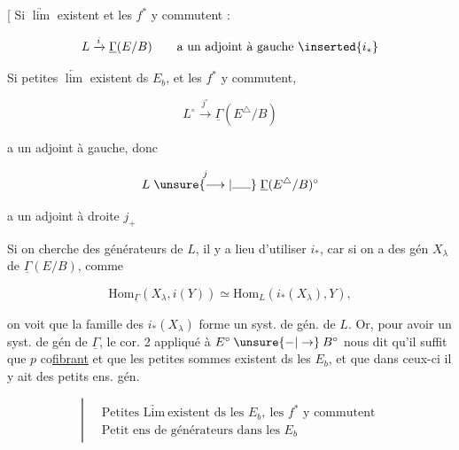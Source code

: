 [ Si  $\underrightarrow{\lim}$ existent  et les $f^*$ y commutent :

\[
L\xrightarrow{i}\underline{\Gamma}(E/B)\qquad\text{a un adjoint à gauche }\inserted{i_*}
\]

Si petites $\underleftarrow{\lim}$ existent ds $E_b$, et les $f^*$ y commutent,

\[
L^\circ\xrightarrow{j^\circ}\underline{\Gamma}(E^{\triangle}/B)
\]

a un adjoint à gauche, donc

\[
L\mathrel{\overset{j}{\unsure{\longrightarrow|\rule{1.5em}{.35pt}}}}\underline{\Gamma}(E^\triangle/B)^\circ
\]

a un adjoint à droite $j_+$

Si on cherche des générateurs de $L$, il y a
lieu d'utiliser $i_*$, car  si on a des
gén $X_\lambda$ de $\underline{\Gamma}(E/B)$, comme

\[
\mathrm{Hom}_{\underline{\Gamma}}(X_\lambda,i(Y))\simeq
\mathrm{Hom}_L(i_*(X_\lambda),Y),
\]

on voit que la famille des $i_*(X_\lambda)$ forme un
syst. de gén. de $L$. Or, pour avoir un 
syst. de gén de $\underline{\Gamma}$, le cor. 2  appliqué
à $E^\circ\mathbin{\unsure{-|\to}}B^\circ$ nous dit qu'il suffit que
$p$ co\uline{fibrant} et que les petites sommes
existent ds les $E_b$, et que dans ceux-ci
il y ait des  petits ens. gén.

\[
\left|\ \begin{aligned}
&\text{Petites }\underrightarrow{\mathrm{Lim}}\ \text{existent ds les }E_b,\ \text{les }f^*\text{ y commutent}\\
&\text{Petit ens de générateurs dans les }E_b
\end{aligned}\right.
\]

